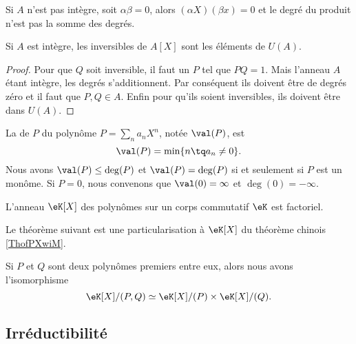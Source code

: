 \begin{remark}
    Si \( A\) n'est pas intègre, soit \( \alpha\beta=0\), alors \( (\alpha X)(\beta x)=0\) et le degré du produit n'est pas la somme des degrés.
\end{remark}

\begin{corollary}
    Si \( A\) est intègre, les inversibles de \( A[X]\) sont les éléments de \( U(A)\).
\end{corollary}

\begin{proof}
    Pour que \( Q\) soit inversible, il faut un \( P\) tel que \( PQ=1\). Mais l'anneau \( A\) étant intègre, les degrés s'additionnent. Par conséquent ils doivent être de degrés zéro et il faut que \( P,Q\in A\). Enfin pour qu'ils soient inversibles, ils doivent être dans \( U(A)\).
\end{proof}

La  de \( P\) du polynôme \( P=\sum_n a_nX^n\), notée \( \val(P)\), est 
\begin{equation}
    \val(P)=\min\{ n\tq a_n\neq 0 \}.
\end{equation}
Nous avons \( \val(P)\leq \deg(P)\) et \( \val(P)=\deg(P)\) si et seulement si \( P\) est un monôme. Si \( P=0\), nous convenons que \( \val(0)=\infty\) et \( \deg(0)=-\infty\).

\begin{proposition}     \label{PropqGZXvr}
    L'anneau \( \eK[X]\) des polynômes sur un corps commutatif \( \eK\) est factoriel.
\end{proposition}

Le théorème suivant est une particularisation à \( \eK[X]\) du théorème chinois \ref{ThofPXwiM}.
\begin{theorem}
    Si \( P\) et \( Q\) sont deux polynômes premiers entre eux, alors nous avons l'isomorphisme
    \begin{equation}
        \eK[X]/(P,Q)\simeq\eK[X]/(P)\times \eK[X]/(Q).
    \end{equation}
\end{theorem}

\subsection{Irréductibilité}


